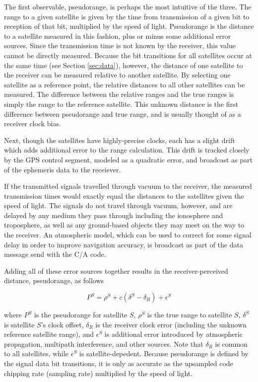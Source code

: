 \documentclass[12pt]{article}
\begin{document}
The first observable, pseudorange, is perhaps the most intuitive of the three. The range to a given satellite is given by the time from transmission of a given bit to reception of that bit, multiplied by the speed of light. Pseudorange is the distance to a satellite measured in this fashion, plus or minus some additional error sources. Since the transmission time is not known by the receiver, this value cannot be directly measured. Because the bit transitions for all satellites occur at the same time (see Section \ref{sec:data}), however, the distance of one satellite to the receiver can be measured relative to another satellite. By selecting one satellite as a reference point, the relative distances to all other satellites can be measured. The difference between the relative ranges and the true ranges is simply the range to the reference satellite. This unknown distance is the first difference between pseudorange and true range, and is usually thought of as a receiver clock bias.

Next, though the satellites have highly-precise clocks, each has a slight drift which adds additional error to the range calculation. This drift is tracked closely by the GPS control segment, modeled as a quadratic error, and broadcast as part of the ephemeris data to the receiever.

If the transmitted signals travelled through vacuum to the receiver, the measured transmission times would exactly equal the distances to the satellites given the speed of light. The signals do not travel through vacuum, however, and are delayed by any medium they pass through including the ionosphere and troposphere, as well as any ground-based objects they may meet on the way to the receiver. An atmospheric model, which can be used to correct for some signal delay in order to improve navigation accuracy, is broadcast as part of the data message send with the C/A code.

Adding all of these error sources together results in the receiver-perceived distance, pseudorange, as follows

\begin{equation}
\label{eqn:pseudorange}
P^S=\rho^S+c(\delta^S-\delta_R)+\epsilon^S
\end{equation}

where $P^S$ is the pseudorange for satellite $S$, $\rho^S$ is the true range to satellite $S$, $\delta^S$ is satellite $S$'s clock offset, $\delta_R$ is the receiver clock error (including the unknown reference satellite range), and $\epsilon^S$ is additional error introduced by atmospheric propagation, multipath interference, and other sources. Note that $\delta_R$ is common to all satellites, while $\epsilon^S$ is satellite-depedent. Because pseudorange is defined by the signal data bit transitions, it is only as accurate as the upsampled code chipping rate (sampling rate) multiplied by the speed of light.
\end{document}
